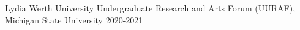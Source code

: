 


\begin{cvhonors}

  \cvhonor
    {Lydia Werth} %
    {University Undergraduate Research and Arts Forum (UURAF), Michigan State University} %
    {} %
    {2020-2021} %
\end{cvhonors}
